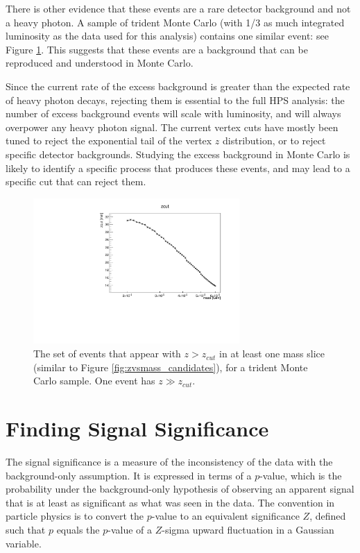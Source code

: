 There is other evidence that these events are a rare detector background and not a heavy photon.
A sample of trident Monte Carlo (with 1/3 as much integrated luminosity as the data used for this analysis) contains one similar event: see Figure \ref{fig:zvsmass_candidates_mc}.
This suggests that these events are a background that can be reproduced and understood in Monte Carlo.

Since the current rate of the excess background is greater than the expected rate of heavy photon decays, rejecting them is essential to the full HPS analysis: the number of excess background events will scale with luminosity, and will always overpower any heavy photon signal.
The current vertex cuts have mostly been tuned to reject the exponential tail of the vertex $z$ distribution, or to reject specific detector backgrounds.
Studying the excess background in Monte Carlo is likely to identify a specific process that produces these events, and may lead to a specific cut that can reject them.

\begin{figure}[ht]
\begin{center}
    \includegraphics[width=0.7\textwidth,page=4,angle=-90]{vertexing/figs/mc_mres_output}
\end{center}
\caption{The set of events that appear with $z>z_{cut}$ in at least one mass slice (similar to Figure \ref{fig:zvsmass_candidates}), for a trident Monte Carlo sample.
One event has $z\gg z_{cut}$.
}
    \label{fig:zvsmass_candidates_mc}
\end{figure}

\clearpage
\section{Finding Signal Significance}
\label{sec:significance}
The signal significance is a measure of the inconsistency of the data with the background-only assumption.
It is expressed in terms of a $p$-value, which is the probability under the background-only hypothesis of observing an apparent signal that is at least as significant as what was seen in the data.
The convention in particle physics is to convert the $p$-value to an equivalent significance $Z$, defined such that $p$ equals the $p$-value of a $Z$-sigma upward fluctuation in a Gaussian variable.

